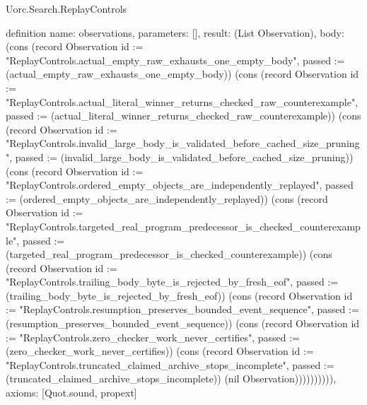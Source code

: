 \begin{lexlean}{Uorc.Search.ReplayControls}
\begin{semanticmodule}
definition{
  name: observations,
  parameters: [],
  result: (List Observation),
  body: (cons (record Observation {id := "ReplayControls.actual_empty_raw_exhausts_one_empty_body", passed := (actual_empty_raw_exhausts_one_empty_body)}) (cons (record Observation {id := "ReplayControls.actual_literal_winner_returns_checked_raw_counterexample", passed := (actual_literal_winner_returns_checked_raw_counterexample)}) (cons (record Observation {id := "ReplayControls.invalid_large_body_is_validated_before_cached_size_pruning", passed := (invalid_large_body_is_validated_before_cached_size_pruning)}) (cons (record Observation {id := "ReplayControls.ordered_empty_objects_are_independently_replayed", passed := (ordered_empty_objects_are_independently_replayed)}) (cons (record Observation {id := "ReplayControls.targeted_real_program_predecessor_is_checked_counterexample", passed := (targeted_real_program_predecessor_is_checked_counterexample)}) (cons (record Observation {id := "ReplayControls.trailing_body_byte_is_rejected_by_fresh_eof", passed := (trailing_body_byte_is_rejected_by_fresh_eof)}) (cons (record Observation {id := "ReplayControls.resumption_preserves_bounded_event_sequence", passed := (resumption_preserves_bounded_event_sequence)}) (cons (record Observation {id := "ReplayControls.zero_checker_work_never_certifies", passed := (zero_checker_work_never_certifies)}) (cons (record Observation {id := "ReplayControls.truncated_claimed_archive_stops_incomplete", passed := (truncated_claimed_archive_stops_incomplete)}) (nil Observation)))))))))),
  axioms: [Quot.sound, propext]
}
\end{semanticmodule}
\end{lexlean}

